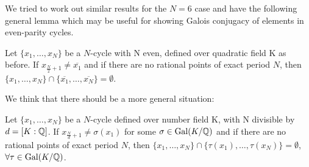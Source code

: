 We tried to work out similar results for the $N = 6$ case and have the
following general lemma which may be useful for showing Galois conjugacy of
elements in even-parity cycles.
\begin{lemma}
	Let $\{x_1, \ldots, x_{N}\}$ be a $N$-cycle with N even,
	defined over quadratic field K as before. If
	$x_{\frac{N}{2}+1} \neq \overline{x_1}$ and if there are no
	rational points of exact period $N$, then $\{x_1, \ldots, x_{N}\}
	\cap \{\overline{x_1}, \ldots, \overline{x_{N}}\} = \emptyset$.
\end{lemma}

We think that there should be a more general situation:
\begin{conjecture}
	Let $\{x_1, \ldots, x_{N}\}$ be a $N$-cycle defined over number field K,
	with N divisible by	$d = [K:\mathbb{Q} ]$. If $x_{\frac{N}{d}+1} \neq \sigma(x_1)$
	for some $\sigma \in \mathrm{Gal}(K/\mathbb{Q})$ and if there are no rational points of
	exact period $N$, then $\{x_1, \ldots, x_{N}\} \cap \{\tau(x_1),
	\ldots, \tau(x_{N})\} = \emptyset$, $\forall \tau \in \mathrm{Gal}(K/\mathbb{Q})$.
\end{conjecture}


